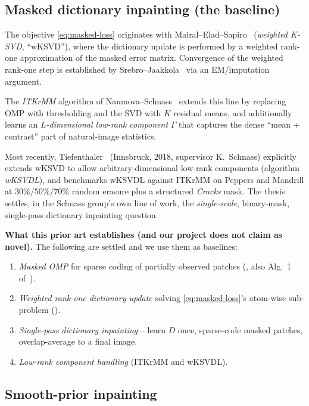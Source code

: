 \documentclass[11pt,a4paper]{article}
\theoremstyle{definition}
\theoremstyle{remark}
\begin{document}
\subsection{Masked dictionary inpainting (the baseline)}

The objective \eqref{eq:masked-loss} originates with
Mairal--Elad--Sapiro~\cite{mairal2008sparse} (\emph{weighted K-SVD},
``wKSVD''), where the dictionary update is performed by a weighted
rank-one approximation of the masked error matrix. Convergence of the
weighted rank-one step is established by
Srebro--Jaakkola~\cite{srebro2003weighted} via an EM/imputation argument.

The \emph{ITKrMM} algorithm of Naumova--Schnass~\cite{naumova2018itkrmm}
extends this line by replacing OMP with thresholding and the SVD with
$K$ residual means, and additionally learns an \emph{$L$-dimensional
low-rank component} $\Gamma$ that captures the dense ``mean +
contrast'' part of natural-image statistics.

Most recently, Tiefenthaler~\cite{tiefenthaler2018thesis} (Innsbruck,
2018, supervisor K.~Schnass) explicitly extends wKSVD to allow
arbitrary-dimensional low-rank components (algorithm \emph{wKSVDL}),
and benchmarks wKSVDL against ITKrMM on Peppers and Mandrill at
$30\%/50\%/70\%$ random erasure plus a structured \emph{Cracks} mask.
The thesis settles, in the Schnass group's own line of work, the
\emph{single-scale}, binary-mask, single-pass dictionary inpainting
question.

\textbf{What this prior art establishes (and our project does not
claim as novel).}\quad
The following are settled and we use them as baselines:
\begin{enumerate}[label=(B\arabic*),leftmargin=2.5em,itemsep=2pt]
\item \emph{Masked OMP} for sparse coding of partially observed
  patches (\cite{mairal2008sparse}, also Alg.~1
  of~\cite{tiefenthaler2018thesis}).
\item \emph{Weighted rank-one dictionary update} solving
  \eqref{eq:masked-loss}'s atom-wise sub-problem
  (\cite{srebro2003weighted,mairal2008sparse,tiefenthaler2018thesis}).
\item \emph{Single-pass dictionary inpainting} -- learn $D$ once,
  sparse-code masked patches, overlap-average to a final image.
\item \emph{Low-rank component handling} (ITKrMM and wKSVDL).
\end{enumerate}

\subsection{Smooth-prior inpainting}
\end{document}
